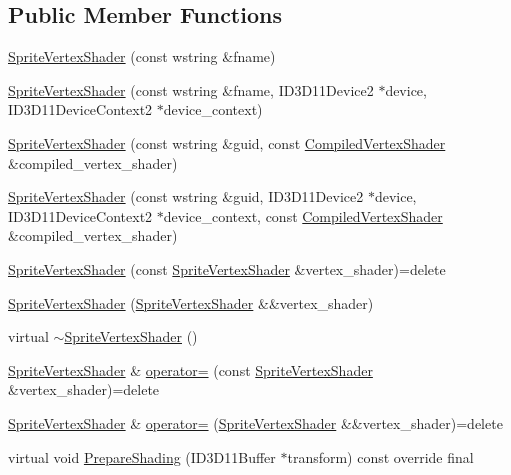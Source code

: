 \subsection*{Public Member Functions}
\begin{DoxyCompactItemize}
\item 
\hyperlink{classmage_1_1_sprite_vertex_shader_a28c6186fc78d99f08af7e84338e5349f}{Sprite\+Vertex\+Shader} (const wstring \&fname)
\item 
\hyperlink{classmage_1_1_sprite_vertex_shader_ad79c6a83fe6ee5b9b4fa04181bff356f}{Sprite\+Vertex\+Shader} (const wstring \&fname, I\+D3\+D11\+Device2 $\ast$device, I\+D3\+D11\+Device\+Context2 $\ast$device\+\_\+context)
\item 
\hyperlink{classmage_1_1_sprite_vertex_shader_a6595b06e329292cd5eec380097d890ff}{Sprite\+Vertex\+Shader} (const wstring \&guid, const \hyperlink{structmage_1_1_compiled_vertex_shader}{Compiled\+Vertex\+Shader} \&compiled\+\_\+vertex\+\_\+shader)
\item 
\hyperlink{classmage_1_1_sprite_vertex_shader_a54f7c1052562f63c07fc9bee5109af98}{Sprite\+Vertex\+Shader} (const wstring \&guid, I\+D3\+D11\+Device2 $\ast$device, I\+D3\+D11\+Device\+Context2 $\ast$device\+\_\+context, const \hyperlink{structmage_1_1_compiled_vertex_shader}{Compiled\+Vertex\+Shader} \&compiled\+\_\+vertex\+\_\+shader)
\item 
\hyperlink{classmage_1_1_sprite_vertex_shader_a00f902a89cc3f9c9ce3d5b526eece29c}{Sprite\+Vertex\+Shader} (const \hyperlink{classmage_1_1_sprite_vertex_shader}{Sprite\+Vertex\+Shader} \&vertex\+\_\+shader)=delete
\item 
\hyperlink{classmage_1_1_sprite_vertex_shader_abc0c5838e2b1941b6a55dbe238e5b6f6}{Sprite\+Vertex\+Shader} (\hyperlink{classmage_1_1_sprite_vertex_shader}{Sprite\+Vertex\+Shader} \&\&vertex\+\_\+shader)
\item 
virtual \hyperlink{classmage_1_1_sprite_vertex_shader_a36e755541ea81318ccf518533358e0d3}{$\sim$\+Sprite\+Vertex\+Shader} ()
\item 
\hyperlink{classmage_1_1_sprite_vertex_shader}{Sprite\+Vertex\+Shader} \& \hyperlink{classmage_1_1_sprite_vertex_shader_a4400ddda9637b280b7c8aedeeec6e4e7}{operator=} (const \hyperlink{classmage_1_1_sprite_vertex_shader}{Sprite\+Vertex\+Shader} \&vertex\+\_\+shader)=delete
\item 
\hyperlink{classmage_1_1_sprite_vertex_shader}{Sprite\+Vertex\+Shader} \& \hyperlink{classmage_1_1_sprite_vertex_shader_aac64cf5df2b118ba95be72aef2bd3dca}{operator=} (\hyperlink{classmage_1_1_sprite_vertex_shader}{Sprite\+Vertex\+Shader} \&\&vertex\+\_\+shader)=delete
\item 
virtual void \hyperlink{classmage_1_1_sprite_vertex_shader_a10be47ca65f4baed735b5ffb52ee92bf}{Prepare\+Shading} (I\+D3\+D11\+Buffer $\ast$transform) const override final
\end{DoxyCompactItemize}
